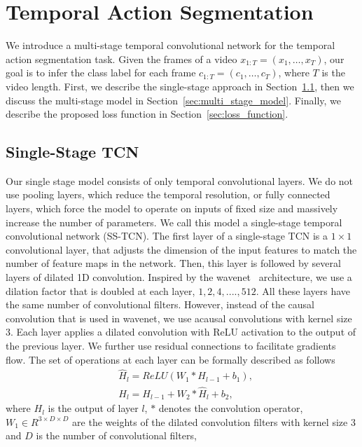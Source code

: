 \documentclass[10pt,twocolumn,letterpaper]{article}
\begin{document}
\section{Temporal Action Segmentation}
We introduce a multi-stage temporal convolutional network for the temporal
action segmentation task. Given the frames of a video 
$x_{1:T} = (x_1,\dots,x_T)$, our goal is to infer the class label for 
each frame $c_{1:T} = (c_1,\dots,c_T)$, where $T$ is the video length.  
First, we describe the single-stage approach in 
Section~\ref{sec:single_stage_model}, then we discuss the multi-stage 
model in Section~\ref{sec:multi_stage_model}. Finally, we describe the 
proposed loss function in Section~\ref{sec:loss_function}.
 
\subsection{Single-Stage TCN}
\label{sec:single_stage_model}
Our single stage model consists of only temporal convolutional layers. 
We do not use pooling layers, which reduce the temporal resolution, or 
fully connected layers, which force the model to operate on inputs of 
fixed size and massively increase the number of parameters. We call this 
model a single-stage temporal convolutional network (SS-TCN).
The first layer of a single-stage TCN is a $1 \times 1$ convolutional layer, 
that adjusts the dimension of the input features to match the number 
of feature maps in the network. Then, this layer is followed by several 
layers of dilated 1D convolution. Inspired by the wavenet~\cite{van2016wavenet} 
architecture, we use a dilation factor that is doubled at each layer, 
\ie $1, 2, 4, ...., 512$. All these layers have the same number of 
convolutional filters. However, instead of the causal convolution that 
is used in wavenet, we use acausal convolutions with kernel size 3. 
Each layer applies a dilated convolution with ReLU activation to the output 
of the previous layer. We further use residual connections to facilitate 
gradients flow. The set of operations at each layer can be formally 
described as follows
 \begin{align}
& \hat{H}_l = ReLU(W_1 * H_{l-1} + b_1), \\
& H_l = H_{l-1} + W_2 * \hat{H}_l + b_2, 
\end{align}
where $H_l$ is the output of layer $l$, $*$ denotes the convolution operator, 
$W_1 \in R^{3 \times D \times D}$ are the weights of the dilated convolution 
filters with kernel size 3 and $D$ is the number of convolutional filters, 
\end{document}
